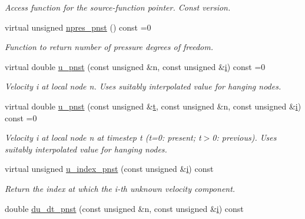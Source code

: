 \begin{DoxyCompactItemize}
\begin{DoxyCompactList}\small\item\em Access function for the source-\/function pointer. Const version. \end{DoxyCompactList}\item 
virtual unsigned \hyperlink{classoomph_1_1PolarNavierStokesEquations_af66cafead00372b56b677ab40a184d1f}{npres\+\_\+pnst} () const =0
\begin{DoxyCompactList}\small\item\em Function to return number of pressure degrees of freedom. \end{DoxyCompactList}\item 
virtual double \hyperlink{classoomph_1_1PolarNavierStokesEquations_ae4bfb7b4c54bf5558111f84119f530d0}{u\+\_\+pnst} (const unsigned \&n, const unsigned \&\hyperlink{cfortran_8h_adb50e893b86b3e55e751a42eab3cba82}{i}) const =0
\begin{DoxyCompactList}\small\item\em Velocity i at local node n. Uses suitably interpolated value for hanging nodes. \end{DoxyCompactList}\item 
virtual double \hyperlink{classoomph_1_1PolarNavierStokesEquations_ace9bb9807c722cd910ed54891df7d58c}{u\+\_\+pnst} (const unsigned \&\hyperlink{cfortran_8h_af6f0bd3dc13317f895c91323c25c2b8f}{t}, const unsigned \&n, const unsigned \&\hyperlink{cfortran_8h_adb50e893b86b3e55e751a42eab3cba82}{i}) const =0
\begin{DoxyCompactList}\small\item\em Velocity i at local node n at timestep t (t=0\+: present; t$>$0\+: previous). Uses suitably interpolated value for hanging nodes. \end{DoxyCompactList}\item 
virtual unsigned \hyperlink{classoomph_1_1PolarNavierStokesEquations_aa478578286aece66720cbd841f450ba0}{u\+\_\+index\+\_\+pnst} (const unsigned \&\hyperlink{cfortran_8h_adb50e893b86b3e55e751a42eab3cba82}{i}) const
\begin{DoxyCompactList}\small\item\em Return the index at which the i-\/th unknown velocity component. \end{DoxyCompactList}\item 
double \hyperlink{classoomph_1_1PolarNavierStokesEquations_ac6c31807b4f2edd3f00965b11b2a0622}{du\+\_\+dt\+\_\+pnst} (const unsigned \&n, const unsigned \&\hyperlink{cfortran_8h_adb50e893b86b3e55e751a42eab3cba82}{i}) const

\end{DoxyCompactItemize}

